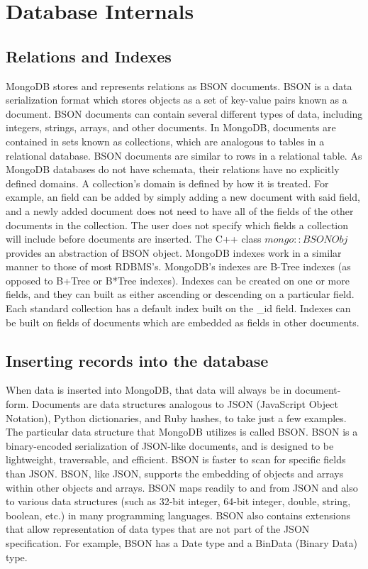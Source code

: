 \documentclass{dependencies/acm_proc_article-sp}
\begin{document}
\section{Database Internals}
\subsection{Relations and Indexes}
MongoDB stores and represents relations as BSON documents\cite{1}.
BSON is a data serialization format which stores objects as a set of key-value pairs known as a document.
BSON documents can contain several different types of data, including integers, strings, arrays, and other documents\cite{2}.
In MongoDB, documents are contained in sets known as collections, which are analogous to tables in a relational database\cite{3}.
BSON documents are similar to rows in a relational table.
As MongoDB databases do not have schemata, their relations have no explicitly defined domains.
A collection's domain is defined by how it is treated.
For example, an field can be added by simply adding a new document with said field, and a newly added document does not need to have all of the fields of the other documents in the collection.
The user does not specify which fields a collection will include before documents are inserted\cite{4}.
The C++ class $mongo::BSONObj$ provides an abstraction of BSON object\cite{5}.
MongoDB indexes work in a similar manner to those of most RDBMS's.
MongoDB's indexes are B-Tree indexes (as opposed to B+Tree or B*Tree indexes).
Indexes can be created on one or more fields, and they can built as either ascending or descending on a particular field.
Each standard collection has a default index built on the \_id field.  Indexes can be built on fields of documents which are embedded as fields in other documents\cite{6}.
\subsection{Inserting records into the database}
When data is inserted into MongoDB, that data will always be in document-form.
Documents are data structures analogous to JSON (JavaScript Object Notation), Python dictionaries, and Ruby hashes, to take just a few examples.
The particular data structure that MongoDB utilizes is called BSON.
BSON is a binary-encoded serialization of JSON-like documents, and is designed to be lightweight, traversable, and efficient.
BSON is faster to scan for specific fields than JSON.
BSON, like JSON, supports the embedding of objects and arrays within other objects and arrays.
BSON maps readily to and from JSON and also to various data structures (such as 32-bit integer, 64-bit integer, double, string, boolean, etc.) in many programming languages.
BSON also contains extensions that allow representation of data types that are not part of the JSON specification.
For example, BSON has a Date type and a BinData (Binary Data) type.
\end{document}
